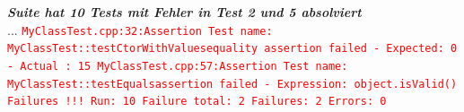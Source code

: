 \begin{multicols}{2}
\begin{minipage}{10cm}
{        \textbf{\textit{Suite hat 10 Tests mit Fehler in Test 2 und 5 absolviert}} \\ 
        ...\newline
        \textcolor{red}{\texttt{MyClassTest.cpp:32:Assertion \newline
        Test name: MyClassTest::testCtorWithValues\newline equality assertion failed\newline
        - Expected: 0 \newline - Actual : 15 \newline \newline        
        MyClassTest.cpp:57:Assertion\newline
        Test name: MyClassTest::testEquals\newline assertion failed\newline
        - Expression: object.isValid()\newline \newline        
        Failures !!!\newline
        Run: 10 \qquad Failure total: 2 \qquad Failures: 2 \qquad Errors: 0}}}
\end{minipage}
\end{multicols}